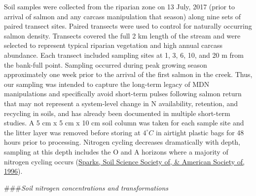 \documentclass [11pt, proquest] {uwthesis}[2015/03/03]
\begin{document}
Soil samples were collected from the riparian zone on 13 July, 2017 (prior to arrival of salmon and any carcass manipulation that season) along nine sets of paired transect sites. Paired transects were used to control for naturally occurring salmon density. Transects covered the full 2 km length of the stream and were selected to represent typical riparian vegetation and high annual carcass abundance. Each transect included sampling sites at 1, 3, 6, 10, and 20 m from the bank-full point. Sampling occurred during peak growing season approximately one week prior to the arrival of the first salmon in the creek. Thus, our sampling was intended to capture the long-term legacy of MDN manipulations and specifically avoid short-term pulses following salmon return that may not represent a system-level change in N availability, retention, and recycling in soils, and has already been documented in multiple short-term studies. A 5 cm x 5 cm x 10 cm soil column was taken for each sample site and the litter layer was removed before storing at \(4^{\circ}C\) in airtight plastic bags for 48 hours prior to processing. Nitrogen cycling decreases dramatically with depth, sampling at this depth includes the O and A horizons where a majority of nitrogen cycling occurs (\protect\hyperlink{ref-Sparks1996}{Sparks, Soil Science Society of, \& American Society of, 1996}).

\#\#\#\emph{Soil nitrogen concentrations and transformations}
\end{document}
